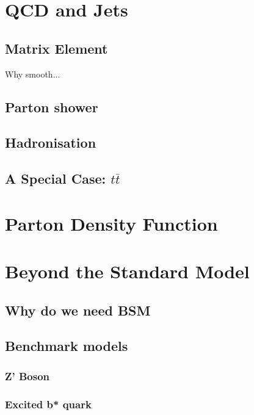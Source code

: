 \section{QCD and Jets}
\label{theo-qcd}
  
\subsection{Matrix Element}
Why smooth...
\subsection{Parton shower}
\subsection{Hadronisation}
\subsection{A Special Case: $t\bar{t}$}

\section{Parton Density Function}
\label{theo-pdf}

\section{Beyond the Standard Model}
\label{theo-bsm}

\subsection{Why do we need BSM}
\subsection{Benchmark models}
\subsubsection{Z' Boson}
\subsubsection{Excited b* quark}
